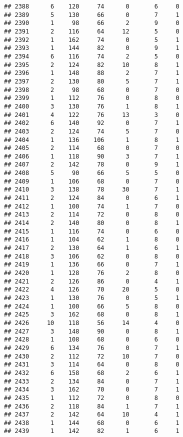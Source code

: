 \documentclass[
]{article}
\begin{document}
\begin{verbatim}
## 2388      6    120     74      0       6     0
## 2389      5    130     66      0       7     1
## 2390      1     98     66      2       9     0
## 2391      2    116     64     12       5     0
## 2392      1    162     74      0       5     1
## 2393      1    144     82      0       9     1
## 2394      6    116     74      2       5     0
## 2395      2    124     82     10       8     1
## 2396      1    148     88      2       7     1
## 2397      2    130     80      5       7     1
## 2398      2     98     68      0       7     0
## 2399      1    112     76      0       8     0
## 2400      3    130     76      1       8     1
## 2401      4    122     76     13       3     0
## 2402      6    140     92      0       7     1
## 2403      2    124     74      5       7     0
## 2404      1    136    106      1       8     1
## 2405      2    114     68      0       7     0
## 2406      1    118     90      3       7     1
## 2407      2    142     78      0       9     1
## 2408      5     90     66      5       5     0
## 2409      1    106     68      0       7     0
## 2410      3    138     78     30       7     1
## 2411      2    124     84      0       6     1
## 2412      1    100     74      1       7     0
## 2413      2    114     72      0       8     0
## 2414      2    140     80      0       8     1
## 2415      1    116     74      0       6     0
## 2416      1    104     62      1       8     0
## 2417      2    130     64      1       6     1
## 2418      3    106     62      0       8     0
## 2419      1    136     66      0       7     1
## 2420      1    128     76      2       8     0
## 2421      2    126     86      0       4     1
## 2422      4    126     70     20       5     0
## 2423      1    130     76      0       5     1
## 2424      1    100     66      5       8     0
## 2425      3    162     68      0       8     1
## 2426     10    118     56     14       4     0
## 2427      3    148     90      0       8     1
## 2428      1    108     68      0       6     0
## 2429      6    134     76      0       7     1
## 2430      2    112     72     10       7     0
## 2431      3    114     64      0       8     0
## 2432      6    158     68      2       6     1
## 2433      2    134     84      0       7     1
## 2434      3    162     70      0       7     1
## 2435      1    112     72      0       8     0
## 2436      2    118     84      1       7     1
## 2437      2    142     64     10       4     1
## 2438      1    144     68      0       6     1
## 2439      1    142     82      1       6     1

\end{verbatim}
\end{document}
